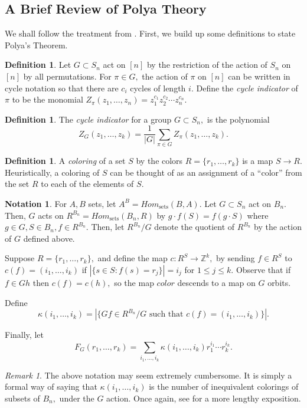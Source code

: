 \documentclass[10 pt]{amsart}
\theoremstyle{plain}
\theoremstyle{definition}
\newtheorem{defn}[thm]{Definition}
\newtheorem{note}[thm]{Notation}
\theoremstyle{remark}
\newtheorem{rem}[thm]{Remark}
\numberwithin{equation}{section}
\newcommand\ssec{\subsection}
\newcommand\BBZ{{\mathbb Z}}
\begin{document}
\ssec{A Brief Review of Polya Theory}

We shall follow the treatment from \cite[Chapter 7]{algebraic_stanley}. First, we build up some definitions to state Polya's Theorem.

\begin{defn}
Let $G \subset S_n$ act on $[n]$ by the restriction of the action of $S_n$ on $[n]$ by all permutations. For $\pi \in G,$ the action of $\pi$ on $[n]$ can be written in cycle notation so that there are $c_i$ cycles of length $i.$ Define the {\it cycle indicator} of $\pi$ to be the monomial $Z_\pi(z_1,\ldots, z_n) = z_1^{c_1}z_2^{c_2}\cdots z_n^{c_n}.$
\end{defn}

\begin{defn}
The {\it cycle indicator} for a group $G \subset S_n,$ is the polynomial $$Z_G(z_1,\ldots, z_k) = \frac{1}{|G|}\sum_{\pi \in G} Z_\pi(z_1,\ldots, z_k).$$
\end{defn}

\begin{defn}
A {\it coloring} of a set $S$ by the colors $R = \{r_1,\ldots, r_k\}$ is a map $S \rightarrow R.$ Heuristically, a coloring of $S$ can be thought of as an assignment of a ``color'' from the set $R$ to each of the elements of $S.$
\end{defn}

\begin{note}
For $A,B$ sets, let $A^B = Hom_{\text{sets}}(B,A).$ Let $G \subset S_n$ act on $B_n.$ Then, $G$ acts on $R^{B_n} = Hom_{\text{sets}}(B_n,R)$ by $g \cdot f(S) = f(g\cdot S)$ where $g \in G,S \in B_n, f \in R^{B_n}.$ Then, let $R^{B_n}/G$ denote the quotient of $R^{B_n}$ by the action of $G$ defined above.

Suppose $R = \{r_1,\ldots, r_k\},$ and define the map $c:R^{S}\rightarrow \BBZ^k,$ by sending $f \in R^S$ to $c(f) = (i_1,\ldots, i_k)$ if $|\{s \in S:f(s) = r_j\}| = i_j$ for $1 \leq j \leq k.$ Observe that if $f \in Gh$ then $c(f) = c(h),$ so the map $color$ descends to a map on $G$ orbits.

Define $$\kappa(i_1,\ldots, i_k) = |\{Gf \in R^{B_n}/G \text{ such that } c(f) = (i_1,\ldots, i_k) \}|.$$

Finally, let 
$$F_G(r_1,\ldots, r_k) = \sum_{i_1,\ldots, i_k} \kappa(i_1,\ldots, i_k)r_1^{i_1} \cdots r_k^{i_k}.$$
\end{note}

\begin{rem}
The above notation may seem extremely cumbersome. It is simply a formal way of saying that $\kappa(i_1,\ldots, i_k)$ is the number of inequivalent colorings of subsets of $B_n,$ under the $G$ action. Once again, see \cite[Chapter 7]{algebraic_stanley} for a more lengthy exposition.
\end{rem}
\end{document}
